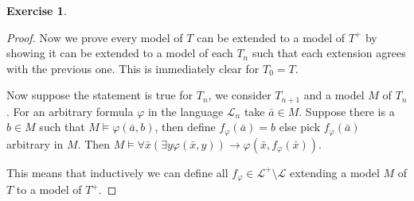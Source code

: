 \documentclass{article}
\newcommand{\lang}{\mathscr{L}}
\theoremstyle{definition}
\newtheorem{question}{Exercise}
\begin{document}
\begin{question}
\begin{enumerate}[(a)]
\begin{proof}
                  Now we prove every model of \(T\) can be extended to a model
                  of \(T^{+}\) by showing it can be extended to a model of each
                  \(T_{n}\) such that each extension agrees with the previous
                  one. This is immediately clear for \(T_{0}=T\).

                  Now suppose the statement is true for \(T_{n}\), we consider
                  \(T_{n+1}\) and a model \(M\) of \(T_{n}\). For an arbitrary
                  formula \(\varphi\) in the language \(\lang_{n}\) take
                  \(\bar{a}\in M\). Suppose there is a \(b\in M\) such that
                  \(M\models\varphi(\bar{a},b)\), then define
                  \(f_{\varphi}(\bar{a})=b\) else pick \(f_{\varphi}(\bar{a})\)
                  arbitrary in \(M\). Then \(M\models\forall\bar{x}\left(\exists
                  y\varphi(\bar{x},y)\right)\to\varphi(\bar{x},f_{\varphi}(\bar{x}))\).

                  This means that inductively we can define all
                  \(f_{\varphi}\in\lang^{+}\setminus\lang\) extending a model
                  \(M\) of \(T\) to a model of \(T^{+}\).
              \end{proof}
    \end{enumerate}
\end{question}
\end{document}
